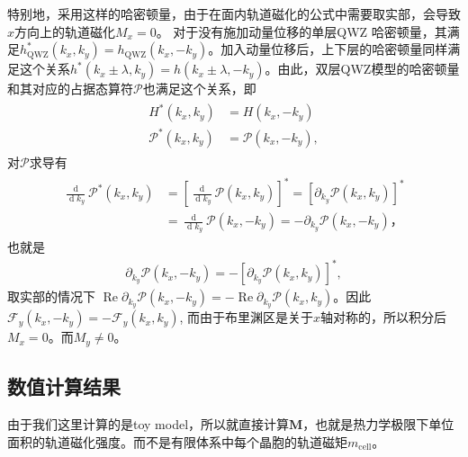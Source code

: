 \documentclass[10pt, oneside]{article}
\begin{document}
特别地，采用这样的哈密顿量，由于在面内轨道磁化的公式中需要取实部，会导致\(x \)方向上的轨道磁化\(M_{x } = 0\)。 对于没有施加动量位移的单层QWZ 哈密顿量，其满足\(h_{\mathrm{QWZ}}^{* } \left(k_{x},k_{y}\right) = h_{\mathrm{QWZ}} \left(k_{x},-k_{y}\right)\)。加入动量位移后，上下层的哈密顿量同样满足这个关系\(h^{*}\left(k_{x} \pm \lambda , k_{y}\right) = h \left(k_{x} \pm \lambda, -k_{y}\right) \)。由此，双层QWZ模型的哈密顿量和其对应的占据态算符\(\mathcal{P}\)也满足这个关系，即
\begin{align}
	\begin{split}
		H^{*} \left(k_{x},k_{y}\right) &= H \left(k_{x}, -k_{y}\right) \\
		\mathcal{P}^{*} \left(k_{x},k_{y}\right) &= \mathcal{P} \left(k_{x}, -k_{y}\right), 
	\end{split}
\end{align}
对\(\mathcal{P}\)求导有
\begin{align}
	\begin{split}
		\frac{\operatorname{d}}{\operatorname{d} k_{y}} \mathcal{P}^{*} \left(k_{x},k_{y}\right) & = \left[\frac{\operatorname{d}}{\operatorname{d} k_{y}} \mathcal{P} \left(k_{x},k_{y}\right) \right]^{*} = \left[\partial_{k_{y}} \mathcal{P} \left(k_{x},k_{y}\right)\right]^{*} \\
		&  = \frac{\operatorname{d}}{\operatorname{d} k_{y}} \mathcal{P} \left(k_{x}, -k_{y}\right) = - \partial_{k_{y}} \mathcal{P} \left(k_{x}, - k_{y}\right)，
	\end{split}
\end{align}
也就是
\begin{align}
	\partial_{k_{y}} \mathcal{P} \left(k_{x}, - k_{y}\right) = - \left[\partial_{k_{y}} \mathcal{P} \left(k_{x},k_{y}\right)\right]^{*},
\end{align}
取实部的情况下 \(\operatorname{Re} \partial_{k_{y}} \mathcal{P} \left(k_{x}, - k_{y}\right)  = - \operatorname{Re} \partial_{k_{y}} \mathcal{P} \left(k_{x},k_{y}\right)\)。因此\(\mathcal{F}_{y} \left(k_{x}, - k_{y}\right) = - \mathcal{F}_{y} \left(k_{x},  k_{y}\right) \), 而由于布里渊区是关于\(x\)轴对称的，所以积分后\(M_{x } = 0\)。而\(M_{y} \neq 0\)。

\subsection{数值计算结果}
由于我们这里计算的是toy model，所以就直接计算\(\bm{M }\)，也就是热力学极限下单位面积的轨道磁化强度。而不是有限体系中每个晶胞的轨道磁矩\(m_{\mathrm{cell}}\)。
\end{document}

